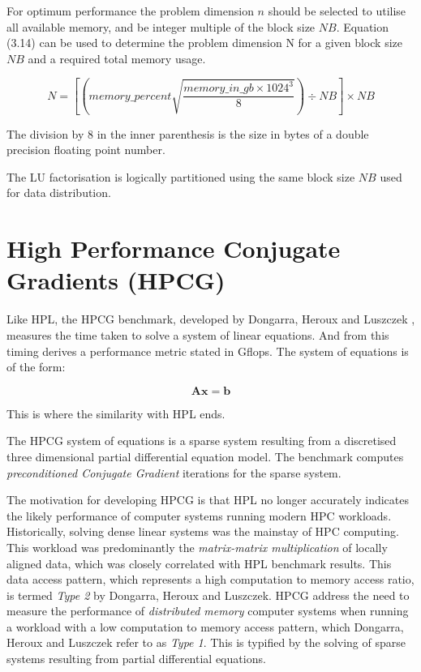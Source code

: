 For optimum performance the problem dimension $n$ should be selected to utilise all available memory, and be integer multiple of the block size $NB$. Equation (3.14) can be used to determine the problem dimension N for a given block size $NB$ and a required total memory usage.

\begin{equation}
N = \left[\left(memory\_percent \sqrt{\frac{memory\_in\_gb \times 1024^3}{8}}\right) \div NB\right] \times NB
\end{equation}

The division by 8 in the inner parenthesis is the size in bytes of a double precision floating point number.

The LU factorisation is logically partitioned using the same block size $NB$ used for data distribution.


%
%
\section{High Performance Conjugate Gradients (HPCG)}

Like HPL, the HPCG benchmark, developed by Dongarra, Heroux and Luszczek \cite{hpcg-benchmark}, measures the time taken to solve a system of linear equations. And from this timing derives a performance metric stated in Gflops. The system of equations is of the form:

\begin{equation}
\mathbf{Ax} = \mathbf{b}
\end{equation}

This is where the similarity with HPL ends.

The HPCG system of equations is a sparse system resulting from a discretised three dimensional partial differential equation model. The benchmark computes \emph{preconditioned Conjugate Gradient} iterations for the sparse system.

The motivation for developing HPCG is that HPL no longer accurately indicates the likely performance of computer systems running modern HPC workloads. Historically, solving dense linear systems was the mainstay of HPC computing. This workload was predominantly the \emph{matrix-matrix multiplication} of locally aligned data, which was closely correlated with HPL benchmark results. This data access pattern, which represents a high computation to memory access ratio, is termed \emph{Type 2} by Dongarra, Heroux and Luszczek. HPCG address the need to measure the performance of \emph{distributed memory} computer systems when running a workload with a low computation to memory access pattern, which Dongarra, Heroux and Luszczek refer to as \emph{Type 1}. This is typified by the solving of sparse systems resulting from partial differential equations.

